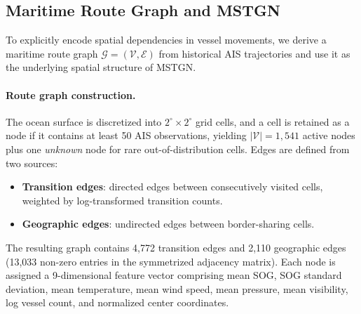 \documentclass[conference]{IEEEtran}
\begin{document}
\subsection{Maritime Route Graph and MSTGN}
\label{sec:mstgn}

To explicitly encode spatial dependencies in vessel movements, we derive a maritime route graph $\mathcal{G} = (\mathcal{V}, \mathcal{E})$ from historical AIS trajectories and use it as the underlying spatial structure of MSTGN.

\paragraph{Route graph construction.}
The ocean surface is discretized into $2^\circ \times 2^\circ$ grid cells, and a cell is retained as a node if it contains at least 50 AIS observations, yielding $|\mathcal{V}| = 1{,}541$ active nodes plus one \textit{unknown} node for rare out-of-distribution cells. Edges are defined from two sources:
\begin{itemize}
    \item \textbf{Transition edges}: directed edges between consecutively visited cells, weighted by log-transformed transition counts.
    \item \textbf{Geographic edges}: undirected edges between border-sharing cells.
\end{itemize}
The resulting graph contains 4{,}772 transition edges and 2{,}110 geographic edges (13{,}033 non-zero entries in the symmetrized adjacency matrix). Each node is assigned a 9-dimensional feature vector comprising mean SOG, SOG standard deviation, mean temperature, mean wind speed, mean pressure, mean visibility, log vessel count, and normalized center coordinates.
\end{document}
